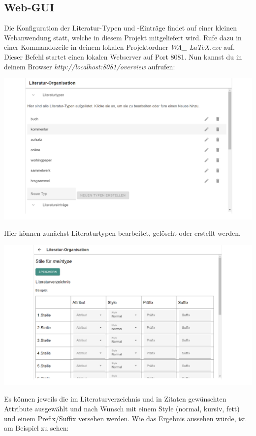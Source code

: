 \documentclass[12pt]{article}
\begin{document}
\subsection{Web-GUI}
Die Konfiguration der Literatur-Typen und -Einträge findet auf einer kleinen Webanwendung statt, welche in diesem Projekt mitgeliefert wird. Rufe dazu in einer Kommandozeile in deinem lokalen Projektordner \textit{WA\_ LaTeX.exe} auf. Dieser Befehl startet einen lokalen Webserver auf Port 8081. Nun kannst du in deinem Browser \textit{http://localhost:8081/overview} aufrufen:
\begin{center}
\includegraphics[width=\textwidth]{dokuImages/gui1.png}
\end{center}
Hier können zunächst Literaturtypen bearbeitet, gelöscht oder erstellt werden.
\begin{center}
\includegraphics[width=\textwidth]{dokuImages/gui_2.png}
\end{center}
Es können jeweils die im Literaturverzeichnis und in Zitaten gewünschten Attribute ausgewählt und nach Wunsch mit einem Style (normal, kursiv, fett) und einem Prefix/Suffix versehen werden. Wie das Ergebnis aussehen würde, ist am Beispiel zu sehen:
\end{document}
